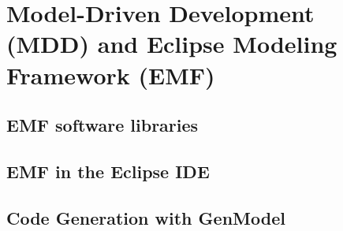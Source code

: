 \section{Model-Driven Development (MDD) and Eclipse Modeling Framework (EMF)}


\subsection{EMF software libraries}

\subsection{EMF in the Eclipse IDE}

\subsection{Code Generation with GenModel}

